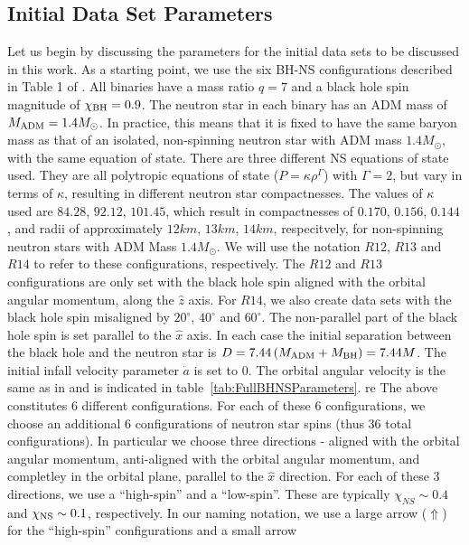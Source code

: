 \subsection{Initial Data Set Parameters}
Let us begin by discussing the parameters for the initial data sets to be discussed in this work. As a starting point, we use the six BH-NS configurations described in Table 1 of \cite{Foucart:2013a}. All binaries have a mass ratio $q=7$ and a black hole spin magnitude of $\chi_{\rm BH}=0.9$. The neutron star in each binary has an ADM mass of $M_{\rm ADM}=1.4M_{\odot}$. In practice, this means that it is fixed to have the same baryon mass as that of an isolated, non-spinning neutron star with ADM mass $1.4M_{\odot}$, with the same equation of state. There are three different NS equations of state used. They are all polytropic equations of state ($P=\kappa\rho^\Gamma$) with $\Gamma=2$, but vary in terms of $\kappa$, resulting in different neutron star compactnesses. The values of $\kappa$ used are $84.28$, $92.12$, $101.45$, which result in compactnesses of $0.170$, $0.156$, $0.144$, and radii of approximately $12km$, $13km$, $14km$, respecitvely, for non-spinning neutron stars with ADM Mass $1.4M_{\odot}$. We will use the notation $R12$, $R13$ and $R14$ to refer to these configurations, respectively. The $R12$ and $R13$ configurations are only set with the black hole spin aligned with the orbital angular momentum, along the $\hat{z}$ axis. For $R14$, we also create data sets with the black hole spin misaligned by $20^{\circ}$, $40^{\circ}$ and $60^{\circ}$. The non-parallel part of the black hole spin is set parallel to the $\hat{x}$ axis. In each case the initial separation between the black hole and the neutron star is $D=7.44\left(M_{\rm ADM}+M_{\rm BH}\right)=7.44M$. The initial infall velocity parameter $\dot{a}$ is set to $0$. The orbital angular velocity is the same as in \cite{Foucart:2013a} and is indicated in table~\ref{tab:FullBHNSParameters}.
re
The above constitutes 6 different configurations. For each of these 6
configurations, we choose an additional 6 configurations of neutron
star spins (thus 36 total configurations). In particular we choose
three directions - aligned with the orbital angular momentum,
anti-aligned with the orbital angular momentum, and completley in the
orbital plane, parallel to the $\hat{x}$ direction. For each of these
3 directions, we use a ``high-spin'' and a ``low-spin''. These are
typically $\chi_{NS}\sim 0.4$ and $\chi_{\rm NS}\sim 0.1$,
respectively. In our naming notation, we use a large arrow
($\Uparrow$)  for the ``high-spin'' configurations and a small arrow
